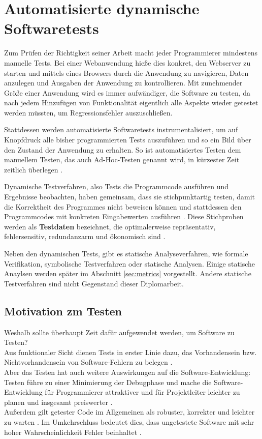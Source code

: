\section{Automatisierte dynamische Softwaretests}
\label{sec:test}
Zum Prüfen der Richtigkeit seiner Arbeit macht jeder Programmierer mindestens manuelle Tests. Bei einer Webanwendung hieße dies konkret, den Webserver zu starten und mittels eines Browsers durch die Anwendung zu navigieren, Daten anzulegen und Ausgaben der Anwendung zu kontrollieren. Mit zunehmender Größe einer Anwendung wird es immer aufwändiger, die Software zu testen, da nach jedem Hinzufügen von Funktionalität eigentlich alle Aspekte wieder getestet werden müssten, um Regressionsfehler auszuschließen.

Stattdessen werden automatisierte Softwaretests instrumentalisiert, um auf Knopfdruck alle bisher programmierten Tests auszuführen und so ein Bild über den Zustand der Anwendung zu erhalten. So ist automatisiertes Testen dem manuellem Testen, das auch Ad-Hoc-Testen genannt wird, in kürzester Zeit zeitlich überlegen \citep{rappin_rails_2011}.

Dynamische Testverfahren, also Tests die Programmcode ausführen und Ergebnisse beobachten, haben gemeinsam, dass sie stichpunktartig testen, damit die Korrektheit des Programmes nicht beweisen können und stattdessen den Programmcodes mit konkreten Eingabewerten ausführen \citep[S. 49]{liggesmeyer_modultest_1990}. Diese Stichproben werden als \textbf{Testdaten} bezeichnet, die optimalerweise repräsentativ, fehlersensitiv, redundanzarm und ökonomisch sind \citep[S. 51]{liggesmeyer_modultest_1990}.

Neben den dynamischen Tests, gibt es statische Analyseverfahren, wie formale Verifikation, symbolische Testverfahren oder statische Analysen. Einige statische Anaylsen werden später im Abschnitt \ref{sec:metrics} vorgestellt. Andere statische Testverfahren sind nicht Gegenstand dieser Diplomarbeit.

\subsection{Motivation zm Testen}
Weshalb sollte überhaupt Zeit dafür aufgewendet werden, um Software zu Testen?\\
Aus funktionaler Sicht dienen Tests in erster Linie dazu, das Vorhandensein bzw. Nichtvorhandensein von Software-Fehlern zu belegen \citep{goodliffe_code_2006}.\\
Aber das Testen hat auch weitere Auswirkungen auf die Software-Entwicklung: Testen führe zu einer Minimierung der Debugphase und mache die Software-Entwicklung für Programmierer attraktiver und für Projektleiter leichter zu planen \citep{orsini_rails_2007} und insgesamt preiswerter \citep[S.13]{liggesmeyer_modultest_1990}.\\
Außerdem gilt getester Code im Allgemeinen als robuster, korrekter und leichter zu warten \citep{rappin_rails_2011}. Im Umkehrschluss bedeutet dies, dass ungetestete Software mit sehr hoher Wahrscheinlichkeit Fehler beinhaltet \citep{goodliffe_code_2006}.

